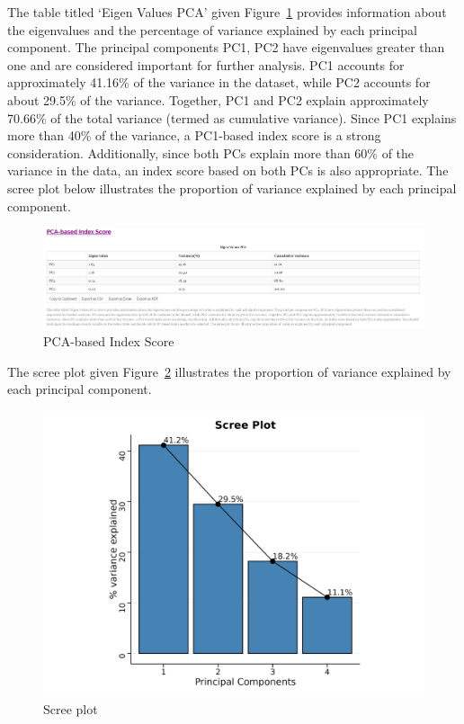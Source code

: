 \documentclass[
  letterpaper,
  DIV=11,
  numbers=noendperiod]{scrartcl}
\begin{document}
The table titled `Eigen Values PCA' given Figure~\ref{fig-PC} provides
information about the eigenvalues and the percentage of variance
explained by each principal component. The principal components PC1, PC2
have eigenvalues greater than one and are considered important for
further analysis. PC1 accounts for approximately 41.16\% of the variance
in the dataset, while PC2 accounts for about 29.5\% of the variance.
Together, PC1 and PC2 explain approximately 70.66\% of the total
variance (termed as cumulative variance). Since PC1 explains more than
40\% of the variance, a PC1-based index score is a strong consideration.
Additionally, since both PCs explain more than 60\% of the variance in
the data, an index score based on both PCs is also appropriate. The
scree plot below illustrates the proportion of variance explained by
each principal component.

\begin{figure}

{\centering \includegraphics{MAN3.webp}

}

\caption{\label{fig-PC}PCA-based Index Score}

\end{figure}

The scree plot given Figure~\ref{fig-screeplot} illustrates the
proportion of variance explained by each principal component.

\begin{figure}

{\centering \includegraphics{CRD_Scree_Plot2025-10-07.webp}

}

\caption{\label{fig-screeplot}Scree plot}

\end{figure}
\end{document}
